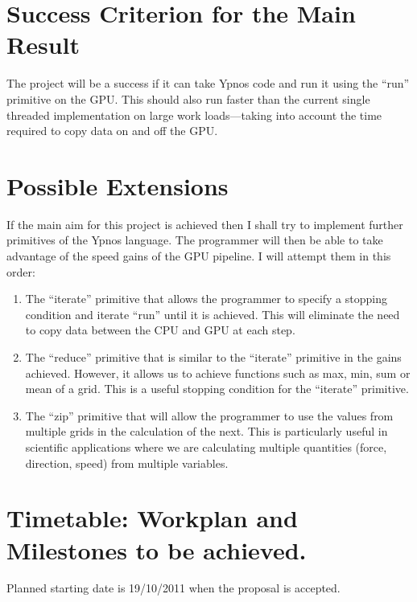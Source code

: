 \section*{Success Criterion for the Main Result}

The project will be a success if it can take Ypnos code and run it using the 
``run'' primitive on the GPU. This should also run faster than the current 
single threaded implementation on large work loads---taking into account the 
time required to copy data on and off the GPU.

\section*{Possible Extensions}

If the main aim for this project is achieved then I shall try to implement 
further primitives of the Ypnos language. The programmer will then be able to 
take advantage of the speed gains of the GPU pipeline. I will attempt them in 
this order:

\begin{enumerate}

\item The ``iterate'' primitive that allows the programmer to specify a 
stopping condition and iterate ``run'' until it is achieved. This will 
eliminate the need to copy data between the CPU and GPU at each step.

\item The ``reduce'' primitive that is similar to the ``iterate'' primitive in 
the gains achieved. However, it allows us to achieve functions such as max, 
min, sum or mean of a grid. This is a useful stopping condition for the 
``iterate'' primitive.

\item The ``zip'' primitive that will allow the programmer to use the values 
from multiple grids in the calculation of the next. This is particularly useful 
in scientific applications where we are calculating multiple quantities (force, 
direction, speed) from multiple variables.

\end{enumerate}


\section*{Timetable: Workplan and Milestones to be achieved.}

Planned starting date is 19/10/2011 when the proposal is accepted.

